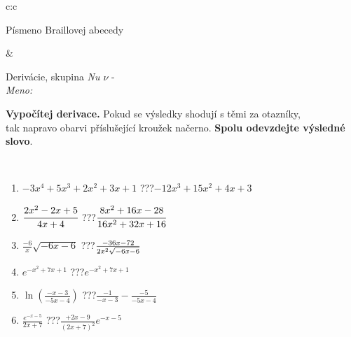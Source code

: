 \documentclass[10pt]{report}
\begin{document}
\begin{tabular}{c:c}
\begin{minipage}[c][104.5mm][t]{0.5\linewidth}
\begin{center}
\begin{minipage}{0.20\linewidth}
\begin{center}
{\small Písmeno Braillovej abecedy}
\end{center}
\end{minipage}
\end{center}
\end{minipage}
&
\begin{minipage}[c][104.5mm][t]{0.5\linewidth}
\begin{center}
\vspace{7mm}
{\huge Derivácie, skupina \textit{Nu $\nu$} -}\\[5mm]
\textit{Meno:}\phantom{xxxxxxxxxxxxxxxxxxxxxxxxxxxxxxxxxxxxxxxxxxxxxxxxxxxxxxxxxxxxxxxxx}\\[5mm]
\begin{minipage}{0.95\linewidth}
\begin{center}
\textbf{Vypočítej derivace.} Pokud se výsledky shodují s těmi za otazníky,\\tak napravo obarvi příslušející kroužek načerno. \textbf{Spolu odevzdejte výsledné slovo}.
\end{center}
\end{minipage}
\\[1mm]
\begin{minipage}{0.79\linewidth}
\begin{center}
\begin{varwidth}{\linewidth}
\begin{enumerate}
\normalsize
\item $-3x^4+5x^3+2x^2+3x+1$\quad \dotfill\; ???\;\dotfill \quad $-12x^3+15x^2+4x+3$
\item $\cfrac{2x^2-2x+5}{4x+4}$\quad \dotfill\; ???\;\dotfill \quad $\cfrac{8x^2+16x-28}{16x^2+32x+16}$
\item $\frac{-6}{x}\sqrt{-6x-6}$\quad \dotfill\; ???\;\dotfill \quad $\frac{-36x-72}{2x^2 \sqrt{\smash[b]{-6x-6}}}$
\item $e^{-x^2+7x+1}$\quad \dotfill\; ???\;\dotfill \quad $e^{-x^2+7x+1}$
\item $\ln{\left(\frac{-x-3}{-5x-4}\right)}$\quad \dotfill\; ???\;\dotfill \quad $\frac{-1}{-x-3}-\frac{-5}{-5x-4}$
\item $\frac{e^{-x-5}}{2x+7}$\quad \dotfill\; ???\;\dotfill \quad $\frac{+2x-9}{(2x+7)^2}e^{-x-5}$
\end{enumerate}
\end{varwidth}
\end{center}
\end{minipage}
\begin{minipage}{0.20\linewidth}
\begin{center}

\end{center}
\end{minipage}
\end{center}
\end{minipage}
\end{tabular}
\end{document}
